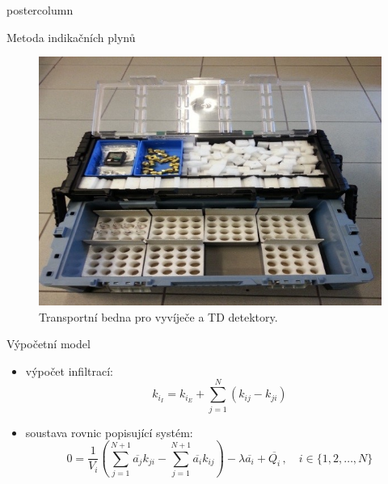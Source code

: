 \documentclass{beamer}
\begin{document}
\begin{frame}
\begin{columns}
\begin{column}{.43\textwidth}
\begin{beamercolorbox}[center]{postercolumn}
\begin{minipage}{.98\textwidth}
{\begin{myblock}{Metoda indikačních plynů}
\begin{minipage}{.5\textwidth}
\begin{figure}
            \includegraphics[width=.85\textwidth]{podklady/transport_bedna.jpg}
            \caption{Transportní bedna pro vyvíječe a TD detektory.}
            \label{fig:transport}
        \end{figure}
    \end{minipage}
\end{myblock}\vfill

\begin{myblock}{Výpočetní model}

\begin{itemize}
    \item výpočet infiltrací:
        \begin{equation}
            k_{i_I}=k_{i_E}+\sum_{j=1}^{N} \left(k_{ij}-k_{ji}\right)
            \label{eq:infiltrace}
        \end{equation}
    \item soustava rovnic popisující systém:
        \begin{equation}
            0=\frac{1}{V_i}\left( \sum^{N+1}_{j=1}\overline{a_j} k_{ji}-\sum^{N+1}_{j=1}\overline{a_i} k_{ij}\right)-\lambda \overline{a_i} +\overline{Q_i}\,,\quad i\in \{1,2,\ldots,N\}\label{eq:vypocet}
        \end{equation}
\end{itemize}


\end{myblock}}
\end{minipage}
\end{beamercolorbox}
\end{column}
\end{columns}
\end{frame}
\end{document}
